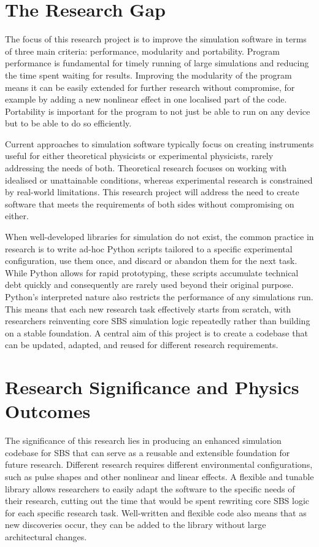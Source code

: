 \section{The Research Gap}

The focus of this research project is to improve the simulation software in terms of three main criteria: performance, modularity and portability. Program performance is fundamental for timely running of large simulations and reducing the time spent waiting for results. Improving the modularity of the program means it can be easily extended for further research without compromise, for example by adding a new nonlinear effect in one localised part of the code. Portability is important for the program to not just be able to run on any device but to be able to do so efficiently.

Current approaches to simulation software typically focus on creating instruments useful for either theoretical physicists or experimental physicists, rarely addressing the needs of both. Theoretical research focuses on working with idealised or unattainable conditions, whereas experimental research is constrained by real-world limitations. This research project will address the need to create software that meets the requirements of both sides without compromising on either.

When well-developed libraries for simulation do not exist, the common practice in research is to write ad-hoc Python 
scripts tailored to a specific experimental configuration, use them once, and discard or abandon them for the next task. 
While Python allows for rapid prototyping, these scripts accumulate technical debt quickly and consequently are rarely used 
beyond their original purpose. Python's interpreted nature also restricts the performance of any simulations run. 
This means that each new research task effectively starts from scratch, with researchers reinventing core SBS simulation 
logic repeatedly rather than building on a stable foundation.
A central aim of this project is to create a codebase that can be updated, adapted, and reused for different research requirements.


\section{Research Significance and Physics Outcomes}

The significance of this research lies in producing an enhanced simulation codebase for SBS that can serve as a reusable and extensible foundation for future research. Different research requires different environmental configurations, such as pulse shapes and other nonlinear and linear effects. A flexible and tunable library allows researchers to easily adapt the software to the specific needs of their research, cutting out the time that would be spent rewriting core SBS logic for each specific research task. Well-written and flexible code also means that as new discoveries occur, they can be added to the library without large architectural changes.

